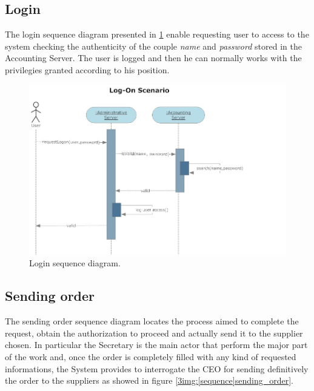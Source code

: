 \subsection{Login}
The login sequence diagram presented in \ref{3img:[sequence]login} enable requesting user to access to the system checking the authenticity of the couple \textit{name} and \textit{password} stored in the Accounting Server. The user is logged and then he can normally works with the privilegies granted according to his position.

\begin{figure}[H]
\begin{centering}
\includegraphics[scale=0.45]{assign3/sdraw/imgs/login.jpg}
\caption{Login sequence diagram.}
\label{3img:[sequence]login}
\end{centering}
\end{figure}


\subsection{Sending order}
The sending order sequence diagram locates the process aimed to complete the request, obtain the authorization to proceed and actually send it to the supplier chosen. In particular the Secretary is the main actor that perform the major part of the work and, once the order is completely filled with any kind of requested informations, the System provides to interrogate the CEO for sending definitively the order to the suppliers as showed in figure \ref{3img:[sequence]sending_order}.

